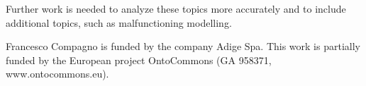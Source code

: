 \documentclass[
]{ceurart}
\begin{document}
Further work is needed to analyze these topics more accurately and to include additional topics, such as malfunctioning modelling.

\acknowledgments

Francesco Compagno is funded by the company Adige Spa. This work is partially funded by the European project
OntoCommons (GA 958371, www.ontocommons.eu).




\end{document}
